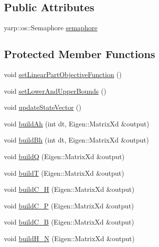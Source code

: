 \subsection*{\-Public \-Attributes}
\begin{DoxyCompactItemize}
\item 
yarp\-::os\-::\-Semaphore \hyperlink{classMIQPController_ae9a603043a180264edabf45320d530ca}{semaphore}
\end{DoxyCompactItemize}
\subsection*{\-Protected \-Member \-Functions}
\begin{DoxyCompactItemize}
\item 
void \hyperlink{classMIQPController_a2d882a4cd9e9832d8b9b2ad73111be0f}{set\-Linear\-Part\-Objective\-Function} ()
\item 
void \hyperlink{classMIQPController_a2caf42a5b5dcd63d67de57cfbb93c653}{set\-Lower\-And\-Upper\-Bounds} ()
\item 
void \hyperlink{classMIQPController_a8320465a1ec80d0cf7ba0d17652feba5}{update\-State\-Vector} ()
\item 
void \hyperlink{classMIQPController_aea16b6eac86da5330c7ffbfdb9c655f5}{build\-Ah} (int dt, \-Eigen\-::\-Matrix\-Xd \&output)
\item 
void \hyperlink{classMIQPController_afc2df705b1238e2503e35f07e2f8270a}{build\-Bh} (int dt, \-Eigen\-::\-Matrix\-Xd \&output)
\item 
void \hyperlink{classMIQPController_af492dfbff2e211ff1c1351c2193fe669}{build\-Q} (\-Eigen\-::\-Matrix\-Xd \&output)
\item 
void \hyperlink{classMIQPController_a52dc10cbc0941a6e4f4e6ffd462fffce}{build\-T} (\-Eigen\-::\-Matrix\-Xd \&output)
\item 
void \hyperlink{classMIQPController_aa58686fc2883ef2d81d3e6d3554b338d}{build\-C\-\_\-\-H} (\-Eigen\-::\-Matrix\-Xd \&output)
\item 
void \hyperlink{classMIQPController_ac2a454e236bdb3a13b72b6930329f231}{build\-C\-\_\-\-P} (\-Eigen\-::\-Matrix\-Xd \&output)
\item 
void \hyperlink{classMIQPController_a1be33f8ebb313f7ecddd2aa6af4fa62c}{build\-C\-\_\-\-B} (\-Eigen\-::\-Matrix\-Xd \&output)
\item 
void \hyperlink{classMIQPController_ab093df4b1c73c02a97609093fd037345}{build\-H\-\_\-\-N} (\-Eigen\-::\-Matrix\-Xd \&output)
\item 

\end{DoxyCompactItemize}
